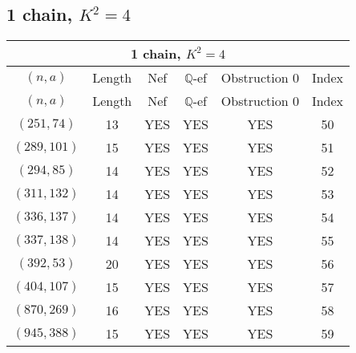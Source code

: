 \subsection{1 chain, $K^2 = 4$}
\begin{longtable}{|c|c|c|c|c|c|}
\hline
\multicolumn{6}{|c|}{1 chain, $K^2 = 4$}\\
\hline
$(n,a)$ & Length & Nef & $\mathbb Q$-ef & Obstruction 0 & Index\\
\hline
\endfirsthead

\hline
$(n,a)$ & Length & Nef & $\mathbb Q$-ef & Obstruction 0 & Index\\
\hline
\endhead
\hline
\endfoot

$(251, 74)$ & 13 & YES & YES & YES & 50\\
$(289, 101)$ & 15 & YES & YES & YES & 51\\
$(294, 85)$ & 14 & YES & YES & YES & 52\\
$(311, 132)$ & 14 & YES & YES & YES & 53\\
$(336, 137)$ & 14 & YES & YES & YES & 54\\
$(337, 138)$ & 14 & YES & YES & YES & 55\\
$(392, 53)$ & 20 & YES & YES & YES & 56\\
$(404, 107)$ & 15 & YES & YES & YES & 57\\
$(870, 269)$ & 16 & YES & YES & YES & 58\\
$(945, 388)$ & 15 & YES & YES & YES & 59
\end{longtable}

